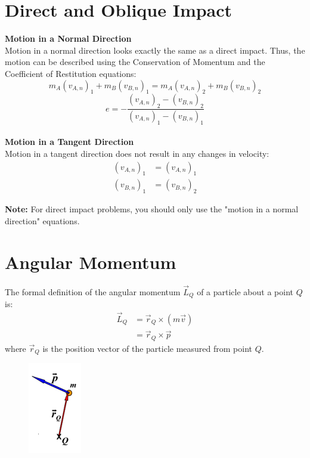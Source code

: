 \documentclass{article}
\begin{document}
\section*{Direct and Oblique Impact}

\textbf{Motion in a Normal Direction} \\
Motion in a normal direction looks exactly the same as a direct impact. Thus, the motion can be described using the Conservation of Momentum and the Coefficient of Restitution equations:
\begin{equation*}
    m_A \left(v_{A, n} \right)_1 + m_B \left( v_{B, n} \right)_1 = m_A \left(v_{A, n} \right)_2 + m_B \left( v_{B, n} \right)_2
\end{equation*}
\begin{equation*}
    e = -\frac{\left(v_{A, n} \right)_2 - \left( v_{B, n} \right)_2}{\left(v_{A, n} \right)_1 - \left( v_{B, n} \right)_1}
\end{equation*} \\

\textbf{Motion in a Tangent Direction} \\
Motion in a tangent direction does not result in any changes in velocity:
\begin{align*}
    \left(v_{A, n} \right)_1 &= \left(v_{A, n} \right)_1 \\
    \left(v_{B, n} \right)_1 &= \left(v_{B, n} \right)_2
\end{align*}

\textbf{Note:} For direct impact problems, you should only use the "motion in a normal direction" equations.

\clearpage


\section*{Angular Momentum}

The formal definition of the angular momentum $\vec{L}_Q$ of a particle about a point $Q$ is:
\begin{align*}
    \vec{L}_Q &= \vec{r}_Q \times \left( m \vec{v} \right) \\
              &= \vec{r}_Q \times \vec{p}
\end{align*}
where $\vec{r}_Q$ is the position vector of the particle measured from point $Q$.

\begin{figure}[h]
    \includegraphics[scale=0.7]{angular_momentum_no_text}
    \centering
\end{figure}
\end{document}
